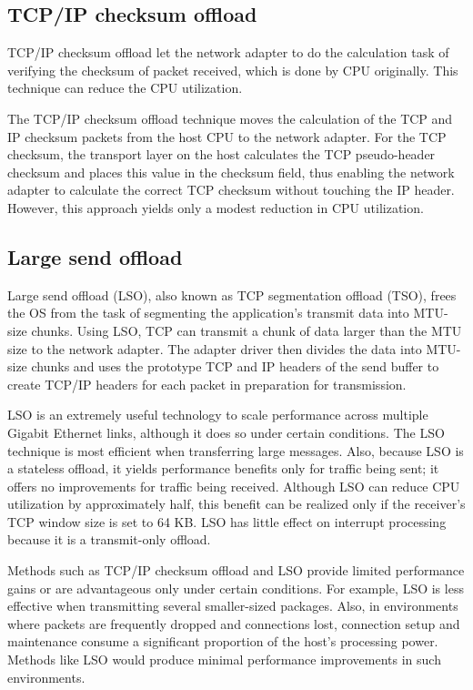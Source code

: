 \documentclass[bsc,frontabs,twoside,singlespacing,parskip,deptreport]{infthesis}     %
\begin{document}
\subsection{TCP/IP checksum offload}


TCP/IP checksum offload let the network adapter to do the calculation task of verifying the checksum of packet received, which is done by CPU originally. This technique can reduce the CPU utilization.


The TCP/IP checksum offload technique moves the calculation of
the TCP and IP checksum packets from the host CPU to the network
adapter. For the TCP checksum, the transport layer on the host calculates
the TCP pseudo-header checksum and places this value in
the checksum field, thus enabling the network adapter to calculate
the correct TCP checksum without touching the IP header. However,
this approach yields only a modest reduction in CPU utilization.



\subsection{Large send offload}

Large send offload (LSO), also known as TCP segmentation offload
(TSO), frees the OS from the task of segmenting the application’s
transmit data into MTU-size chunks. Using LSO, TCP can transmit
a chunk of data larger than the MTU size to the network adapter.
The adapter driver then divides the data into MTU-size chunks and
uses the prototype TCP and IP headers of the send buffer to create
TCP/IP headers for each packet in preparation for transmission.



LSO is an extremely useful technology to scale performance
across multiple Gigabit Ethernet links, although it does so under certain
conditions. The LSO technique is most efficient when transferring
large messages. Also, because LSO is a stateless offload, it yields
performance benefits only for traffic being sent; it offers no improvements
for traffic being received. Although LSO can reduce CPU utilization
by approximately half, this benefit can be realized only if
the receiver’s TCP window size is set to 64 KB. LSO has little effect
on interrupt processing because it is a transmit-only offload.


Methods such as TCP/IP checksum offload and LSO provide limited performance gains or are advantageous only under certain conditions. For example, LSO is less effective when transmitting several smaller-sized packages. Also, in environments where packets are frequently dropped and connections lost, connection setup and maintenance consume a significant proportion of the host’s processing power. Methods like LSO would produce minimal performance improvements in such environments.
\end{document}
